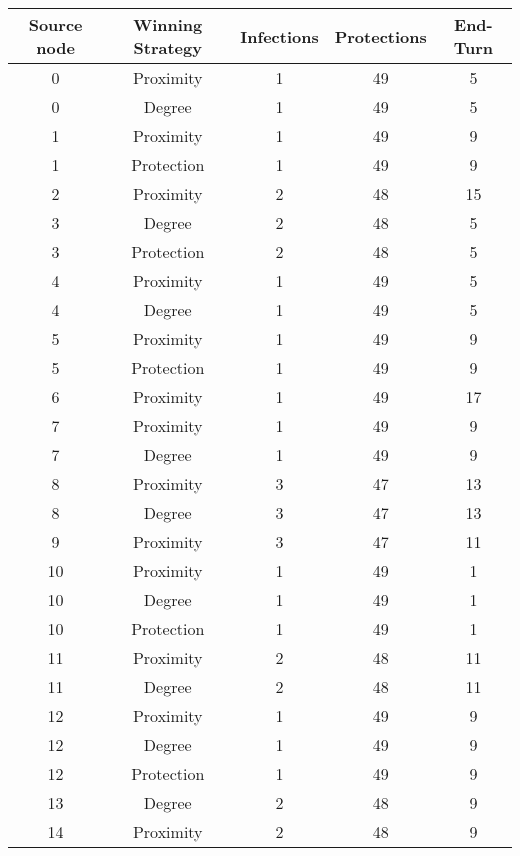 \documentclass[results.tex]{subfiles}
\begin{document}
\begin{center}
  \begin{tabular}{| c || c | c | c | c |}
    \hline
    {\bfseries Source node} & {\bfseries Winning Strategy} & {\bfseries Infections} & {\bfseries Protections} & {\bfseries End-Turn} \\  %
    \hline\hline
    0 & Proximity & 1 & 49 & 5 \\ 
    \hline
    0 & Degree & 1 & 49 & 5 \\ 
    \hline
    1 & Proximity & 1 & 49 & 9 \\ 
    \hline
    1 & Protection & 1 & 49 & 9 \\ 
    \hline
    2 & Proximity & 2 & 48 & 15 \\ 
    \hline
    3 & Degree & 2 & 48 & 5 \\ 
    \hline
    3 & Protection & 2 & 48 & 5 \\ 
    \hline
    4 & Proximity & 1 & 49 & 5 \\ 
    \hline
    4 & Degree & 1 & 49 & 5 \\ 
    \hline
    5 & Proximity & 1 & 49 & 9 \\ 
    \hline
    5 & Protection & 1 & 49 & 9 \\ 
    \hline
    6 & Proximity & 1 & 49 & 17 \\ 
    \hline
    7 & Proximity & 1 & 49 & 9 \\ 
    \hline
    7 & Degree & 1 & 49 & 9 \\ 
    \hline
    8 & Proximity & 3 & 47 & 13 \\ 
    \hline
    8 & Degree & 3 & 47 & 13 \\ 
    \hline
    9 & Proximity & 3 & 47 & 11 \\ 
    \hline
    10 & Proximity & 1 & 49 & 1 \\ 
    \hline
    10 & Degree & 1 & 49 & 1 \\ 
    \hline
    10 & Protection & 1 & 49 & 1 \\ 
    \hline
    11 & Proximity & 2 & 48 & 11 \\ 
    \hline
    11 & Degree & 2 & 48 & 11 \\ 
    \hline
    12 & Proximity & 1 & 49 & 9 \\ 
    \hline
    12 & Degree & 1 & 49 & 9 \\ 
    \hline
    12 & Protection & 1 & 49 & 9 \\ 
    \hline
    13 & Degree & 2 & 48 & 9 \\ 
    \hline
    14 & Proximity & 2 & 48 & 9 \\ 

\end{tabular}
\end{center}
\end{document}
